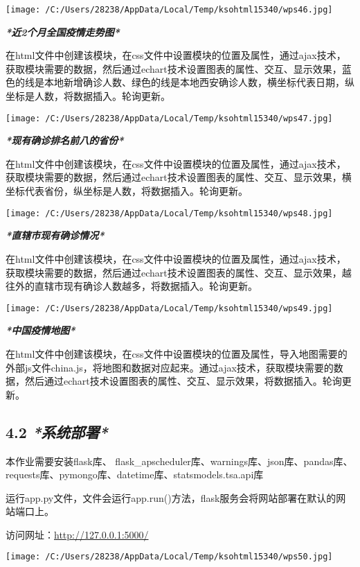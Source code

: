 \documentclass[
]{article}
\begin{document}
\texttt{[image: /C:/Users/28238/AppData/Local/Temp/ksohtml15340/wps46.jpg]}

\emph{\textbf{*近2个月全国疫情走势图*}}

在html文件中创建该模块，在css文件中设置模块的位置及属性，通过ajax技术，获取模块需要的数据，然后通过echart技术设置图表的属性、交互、显示效果，蓝色的线是本地新增确诊人数、绿色的线是本地西安确诊人数，横坐标代表日期，纵坐标是人数，将数据插入。轮询更新。

\texttt{[image: /C:/Users/28238/AppData/Local/Temp/ksohtml15340/wps47.jpg]}

\emph{\textbf{*现有确诊排名前八的省份*}}

在html文件中创建该模块，在css文件中设置模块的位置及属性，通过ajax技术，获取模块需要的数据，然后通过echart技术设置图表的属性、交互、显示效果，横坐标代表省份，纵坐标是人数，将数据插入。轮询更新。

\texttt{[image: /C:/Users/28238/AppData/Local/Temp/ksohtml15340/wps48.jpg]}

\emph{\textbf{*直辖市现有确诊情况*}}

在html文件中创建该模块，在css文件中设置模块的位置及属性，通过ajax技术，获取模块需要的数据，然后通过echart技术设置图表的属性、交互、显示效果，越往外的直辖市现有确诊人数越多，将数据插入。轮询更新。

\texttt{[image: /C:/Users/28238/AppData/Local/Temp/ksohtml15340/wps49.jpg]}

\emph{\textbf{*中国疫情地图*}}

在html文件中创建该模块，在css文件中设置模块的位置及属性，导入地图需要的外部js文件china.js，将地图和数据对应起来。通过ajax技术，获取模块需要的数据，然后通过echart技术设置图表的属性、交互、显示效果，将数据插入。轮询更新。

\hypertarget{42-ux7cfbux7edfux90e8ux7f72}{%
\subsection{\texorpdfstring{\textbf{4.2}
\emph{\textbf{*系统部署*}}}{4.2 *系统部署*}}\label{42-ux7cfbux7edfux90e8ux7f72}}

本作业需要安装flask库、
flask\_apscheduler库、warnings库、json库、pandas库、requests库、pymongo库、datetime库、statsmodels.tsa.api库

运行app.py文件，文件会运行app.run()方法，flask服务会将网站部署在默认的网站端口上。

访问网址：\url{http://127.0.0.1:5000/}

\texttt{[image: /C:/Users/28238/AppData/Local/Temp/ksohtml15340/wps50.jpg]}
\end{document}

